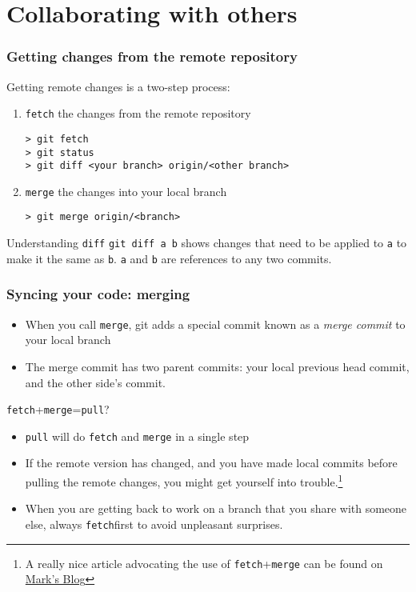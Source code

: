 \section{Collaborating with others}



\begin{frame}[fragile]
	\frametitle{Getting changes from the remote repository}
	
	Getting remote changes is a two-step process:
	\begin{enumerate}
		\item \texttt{fetch} the changes from the remote repository
	\begin{verbatim}
> git fetch
> git status
> git diff <your branch> origin/<other branch>
	\end{verbatim}
		\item \texttt{merge} the changes into your local branch
	\begin{verbatim}
> git merge origin/<branch>
	\end{verbatim}
	\end{enumerate}
	
	\begin{block}{Understanding \texttt{diff}}
	\texttt{git diff a b} shows changes that need to be applied to \texttt{a} to make it the same as \texttt{b}. \texttt{a} and \texttt{b} are references to any two commits.
	\end{block}
	
\end{frame}


\begin{frame}[fragile]
	\frametitle{Syncing your code: merging}
	\begin{itemize}
	\item When you call \texttt{merge}, git adds a special commit known as a \textit{merge commit} to your local branch
	\item The merge commit has two parent commits: your local previous head commit, and the other side's commit.
	\end{itemize}
	\begin{block}{\texttt{fetch}+\texttt{merge}=\texttt{pull}?}
	\begin{itemize}	
	\small
	\item \texttt{pull} will do \texttt{fetch} and \texttt{merge} in a single step
	\item If the remote version has changed, and you have made local commits before pulling the remote changes, you might get yourself into trouble.\footnote{A really nice article advocating the use of \texttt{fetch}+\texttt{merge} can be found on \href{http://longair.net/blog/2009/04/16/git-fetch-and-merge/}{Mark's Blog}} 
	\item When you are getting back to work on a branch that you share with someone else, always \texttt{fetch}first to avoid unpleasant surprises.
	\end{itemize}
	\end{block}
\end{frame}

